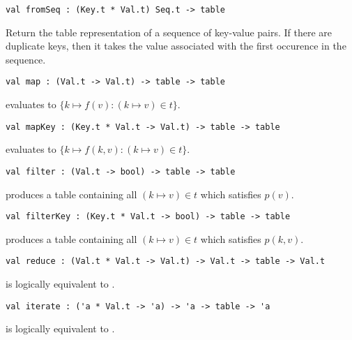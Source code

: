 \begin{gram}[fromSeq]
\begin{verbatim}
val fromSeq : (Key.t * Val.t) Seq.t -> table
\end{verbatim}
Return the table representation of a sequence of key-value pairs. If there are
duplicate keys, then it takes the value associated with the first occurence in
the sequence.
\end{gram}

\begin{gram}[map]
\begin{verbatim}
val map : (Val.t -> Val.t) -> table -> table
\end{verbatim}
 evaluates to $\{k \mapsto f(v) : (k \mapsto v) \in t\}$.
\end{gram}

\begin{gram}[mapKey]
\begin{verbatim}
val mapKey : (Key.t * Val.t -> Val.t) -> table -> table
\end{verbatim}
 evaluates to $\{k \mapsto f(k, v) : (k \mapsto v) \in t\}$.
\end{gram}

\begin{gram}[filter]
\begin{verbatim}
val filter : (Val.t -> bool) -> table -> table
\end{verbatim}
 produces a table containing all $(k \mapsto v) \in t$ which
satisfies $p(v)$.
\end{gram}

\begin{gram}[filterKey]
\begin{verbatim}
val filterKey : (Key.t * Val.t -> bool) -> table -> table
\end{verbatim}
 produces a table containing all $(k \mapsto v) \in t$ which
satisfies $p(k,v)$.
\end{gram}

\begin{gram}[reduce]
\begin{verbatim}
val reduce : (Val.t * Val.t -> Val.t) -> Val.t -> table -> Val.t
\end{verbatim}
 is logically equivalent to .
\end{gram}

\begin{gram}[iterate]
\begin{verbatim}
val iterate : ('a * Val.t -> 'a) -> 'a -> table -> 'a
\end{verbatim}
 is logically equivalent to .
\end{gram}

